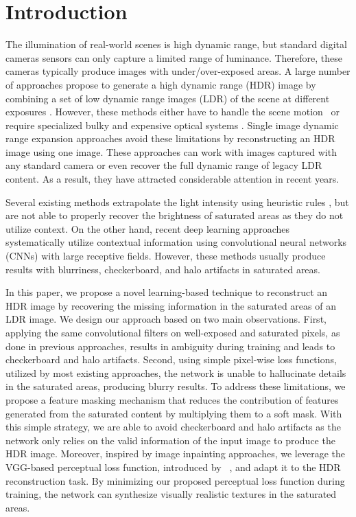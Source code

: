 \vspace{40pt}
\section{Introduction}

The illumination of real-world scenes is high dynamic range, but standard digital cameras sensors can only capture a limited range of luminance. Therefore, these cameras typically produce images with under/over-exposed areas. A large number of approaches propose to generate a high dynamic range (HDR) image by combining a set of low dynamic range images (LDR) of the scene at different exposures \cite{debevec1997recovering}. However, these methods either have to handle the scene motion~\cite{ kalantari2017deep, wu2018deep, kang2003high, sen2012robust, hu2013hdr, oh2014robust} or require specialized bulky and expensive optical systems \cite{mcguire2007optical, tocci2011versatile}. Single image dynamic range expansion approaches avoid these limitations by reconstructing an HDR image using one image. These approaches can work with images captured with any standard camera or even recover the full dynamic range of legacy LDR content. As a result, they have attracted considerable attention in recent years. 

Several existing methods extrapolate the light intensity using heuristic rules \cite{banterle2006inverse, rempel2007ldr2hdr, bist2017tone}, but are not able to properly recover the brightness of saturated areas as they do not utilize context. On the other hand, recent deep learning approaches \cite{endo2017deep, lee2018deep, eilertsen2017hdr} systematically utilize contextual information using convolutional neural networks (CNNs) with large receptive fields. However, these methods usually produce results with blurriness, checkerboard, and halo artifacts in saturated areas.

In this paper, we propose a novel learning-based technique to reconstruct an HDR image by recovering the missing information in the saturated areas of an LDR image. We design our approach based on two main observations. First, applying the same convolutional filters on well-exposed and saturated pixels, as done in previous approaches, results in ambiguity during training and leads to checkerboard and halo artifacts. Second, using simple pixel-wise loss functions, utilized by most existing approaches, the network is unable to hallucinate details in the saturated areas, producing blurry results. To address these limitations, we propose a feature masking mechanism that reduces the contribution of features generated from the saturated content by multiplying them to a soft mask. With this simple strategy, we are able to avoid checkerboard and halo artifacts as the network only relies on the valid information of the input image to produce the HDR image. Moreover, inspired by image inpainting approaches, we leverage the VGG-based perceptual loss function, introduced by ~\citet{gatys2016image}, and adapt it to the HDR reconstruction task. By minimizing our proposed perceptual loss function during training, the network can synthesize visually realistic textures in the saturated areas.

